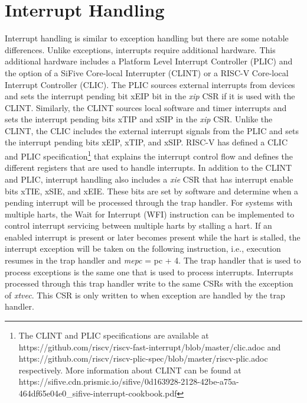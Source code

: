 \documentclass[12pt]{article}
\begin{document}
\section{Interrupt Handling}
Interrupt handling is similar to exception handling but there are some notable differences. Unlike exceptions, interrupts require additional hardware. This additional hardware includes a Platform Level Interrupt Controller (PLIC) and the option of a SiFive Core-local Interrupter (CLINT) or a RISC-V Core-local Interrupt Controller (CLIC). The PLIC sources external interrupts from devices and sets the interrupt pending bit xEIP bit in the \emph{xip} CSR if it is used with the CLINT. Similarly, the CLINT sources local software and timer interrupts and sets the interrupt pending bits xTIP and xSIP in the \emph{xip} CSR. Unlike the CLINT, the CLIC includes the external interrupt signals from the PLIC and sets the interrupt pending bits xEIP, xTIP, and xSIP. RISC-V has defined a CLIC and PLIC specification\footnote[5]{The CLINT and PLIC specifications are available at https://github.com/riscv/riscv-fast-interrupt/blob/master/clic.adoc and https://github.com/riscv/riscv-plic-spec/blob/master/riscv-plic.adoc respectively. More information about CLINT can be found at https://sifive.cdn.prismic.io/sifive/0d163928-2128-42be-a75a-464df65e04e0\_sifive-interrupt-cookbook.pdf} that explains the interrupt control flow and defines the different registers that are used to handle interrupts. In addition to the CLINT and PLIC, interrupt handling also includes a \emph{xie} CSR that has interrupt enable bits xTIE, xSIE, and xEIE. These bits are set by software and determine when a pending interrupt will be processed through the trap handler. For systems with multiple harts, the Wait for Interrupt (WFI) instruction can be implemented to control interrupt servicing between multiple harts by stalling a hart. If an enabled interrupt is present or later becomes present while the hart is stalled, the interrupt exception will be taken on the following instruction, i.e., execution resumes in the trap handler and \emph{mepc} = pc + 4. The trap handler that is used to process exceptions is the same one that is used to process interrupts. Interrupts processed through this trap handler write to the same CSRs with the exception of \emph{xtvec}. This CSR is only written to when exception are handled by the trap handler.
\end{document}
